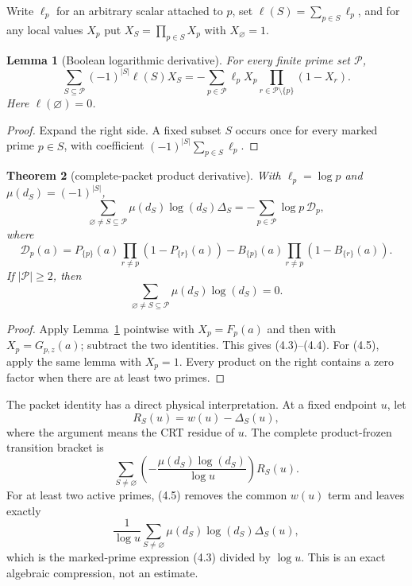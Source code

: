 \documentclass[11pt]{article}
\newtheorem{theorem}{Theorem}[section]
\newtheorem{lemma}[theorem]{Lemma}
\newcommand{\DeltaP}{\Delta}
\newcommand{\muM}{\mu}
\begin{document}
Write $\ell_p$ for an arbitrary scalar attached to $p$, set
$\ell(S)=\sum_{p\in S}\ell_p$, and for any local values $X_p$ put
$X_S=\prod_{p\in S}X_p$ with $X_\varnothing=1$.

\begin{lemma}[Boolean logarithmic derivative]
\label{lem:derivative}
For every finite prime set $\mathcal P$,
\[
 \sum_{S\subseteq\mathcal P}(-1)^{|S|}\ell(S)X_S
 =-\sum_{p\in\mathcal P}\ell_pX_p
     \prod_{r\in\mathcal P\setminus\{p\}}(1-X_r).
 \tag{4.2}
\]
Here $\ell(\varnothing)=0$.
\end{lemma}

\begin{proof}
Expand the right side.  A fixed subset $S$ occurs once for every marked
prime $p\in S$, with coefficient
$(-1)^{|S|}\sum_{p\in S}\ell_p$.
\end{proof}

\begin{theorem}[complete-packet product derivative]
\label{thm:packet}
With $\ell_p=\log p$ and $\muM(d_S)=(-1)^{|S|}$,
\[
 \sum_{\varnothing\ne S\subseteq\mathcal P}
 \muM(d_S)\log(d_S)\DeltaP_S
 =-\sum_{p\in\mathcal P}\log p\,\mathcal D_p,
 \tag{4.3}
\]
where
\[
 \mathcal D_p(a)=
 P_{\{p\}}(a)\prod_{r\ne p}(1-P_{\{r\}}(a))
 -B_{\{p\}}(a)\prod_{r\ne p}(1-B_{\{r\}}(a)).
 \tag{4.4}
\]
If $|\mathcal P|\ge2$, then
\[
 \sum_{\varnothing\ne S\subseteq\mathcal P}
 \muM(d_S)\log(d_S)=0.
 \tag{4.5}
\]
\end{theorem}

\begin{proof}
Apply Lemma~\ref{lem:derivative} pointwise with $X_p=F_p(a)$ and then
with $X_p=G_{p,z}(a)$; subtract the two identities.  This gives (4.3)--(4.4).
For (4.5), apply the same lemma with $X_p=1$.  Every product on the right
contains a zero factor when there are at least two primes.
\end{proof}

The packet identity has a direct physical interpretation.  At a fixed
endpoint $u$, let
\[
 R_S(u)=w(u)-\DeltaP_S(u),
 \tag{4.6}
\]
where the argument means the CRT residue of $u$.  The complete product-frozen
transition bracket is
\[
 \sum_{S\ne\varnothing}
 \left(-\frac{\muM(d_S)\log(d_S)}{\log u}\right)R_S(u).
 \tag{4.7}
\]
For at least two active primes, (4.5) removes the common $w(u)$ term and
leaves exactly
\[
 \frac1{\log u}
 \sum_{S\ne\varnothing}\muM(d_S)\log(d_S)\DeltaP_S(u),
 \tag{4.8}
\]
which is the marked-prime expression (4.3) divided by $\log u$.  This is an
exact algebraic compression, not an estimate.
\end{document}
